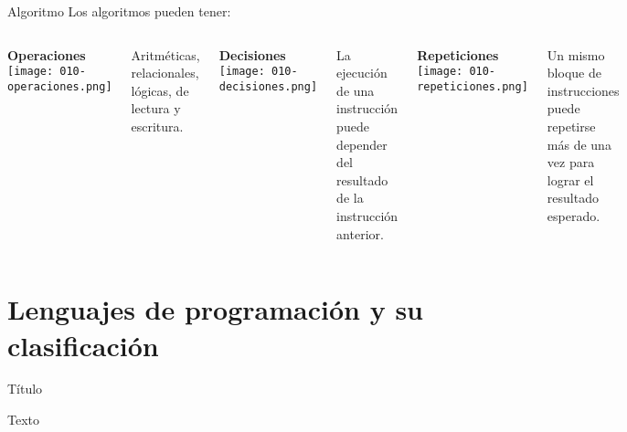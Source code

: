\begin{frame}[c]{Algoritmo}
  Los algoritmos pueden tener:

  \begin{columns}[t]
      \begin{center}
        \textbf{Operaciones} \\
        \texttt{[image: 010-operaciones.png]}
      \end{center}
      Aritméticas, relacionales, lógicas, de lectura y escritura.

      \begin{center}
      \textbf{Decisiones} \\
        \texttt{[image: 010-decisiones.png]}
      \end{center}
      La ejecución de una instrucción puede depender del resultado de la
      instrucción anterior.

      \begin{center}
      \textbf{Repeticiones} \\
        \texttt{[image: 010-repeticiones.png]}
      \end{center}
      Un mismo bloque de instrucciones puede repetirse más de una vez para
      lograr el resultado esperado.
  \end{columns}
\end{frame}

\section{Lenguajes de programación y su clasificación}

\begin{frame}[c]{Título}
    \begin{center}
        Texto
    \end{center}
\end{frame}
